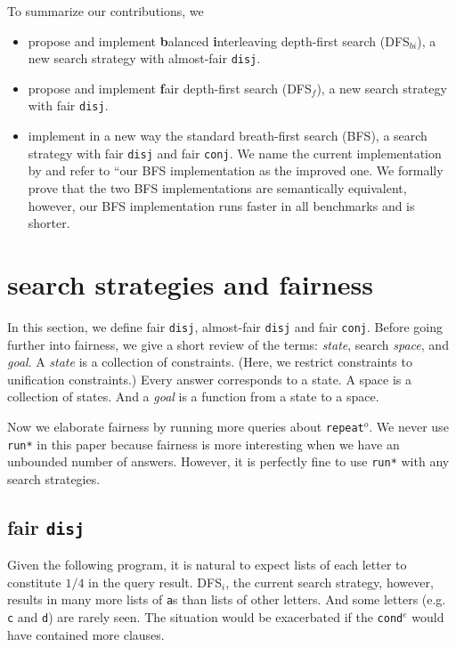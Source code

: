 \documentclass[format=acmlarge, review=true, authordraft=true]{acmart}
\newcommand{\conde}{\texttt{cond$^e$}}
\newcommand{\conj}{\texttt{conj}}
\newcommand{\disj}{\texttt{disj}}
\newcommand{\repeato}{\texttt{repeat$^o$}}
\newcommand{\DFSi }[0]{DFS$_{i}$}
\newcommand{\DFSf }[0]{DFS$_{f}$}
\newcommand{\DFSbi}[0]{DFS$_{bi}$}
\newcommand{\BFS}[0]{BFS}
\begin{document}
To summarize our contributions, we
\begin{itemize}
	\item propose and implement \textbf{b}alanced \textbf{i}nterleaving 
depth-first search (\DFSbi{}), a new search strategy with almost-fair \disj{}.
	\item propose and implement \textbf{f}air depth-first search (\DFSf{}), 
a new search strategy with fair \disj{}.
	\item implement in a new way the standard breath-first search (\BFS), a 
search strategy with fair \disj{} and fair \conj{}. We name the current 
implementation by \citeauthor{seres1999algebra} and refer to ``our 
BFS implementation as the improved one. We formally prove
that the two BFS implementations are semantically 
equivalent, however, our BFS implementation runs faster in all 
benchmarks and is shorter.
\end{itemize}

\section{search strategies and fairness}

In this section, we define fair \disj{}, almost-fair \disj{} and fair \conj{}. 
Before going further into fairness, we give a short review of the terms:
\emph{state}, search \emph{space}, and \emph{goal}.
A \emph{state} is a collection of constraints. (Here, we restrict 
constraints to unification constraints.) Every answer corresponds to a 
state. A space is a collection of states. And a \emph{goal} is a 
function from a state to a space.


Now we elaborate fairness by running more queries about \repeato{}. We never 
use \texttt{run*} in this paper because fairness is more interesting when we 
have an unbounded number of answers. However, it is perfectly fine to use 
\texttt{run*} with any search strategies.

\subsection{fair \texttt{disj}}

Given the following program, it is natural to expect lists of each letter to
constitute $1/4$ in the query result. \DFSi, the current search
strategy, however, results in many more lists of \texttt{a}s than lists
of other letters. And some letters  (e.g. \texttt{c} and \texttt{d}) are
rarely seen. The situation would be exacerbated if the \conde{} would have
contained more clauses.
\end{document}
